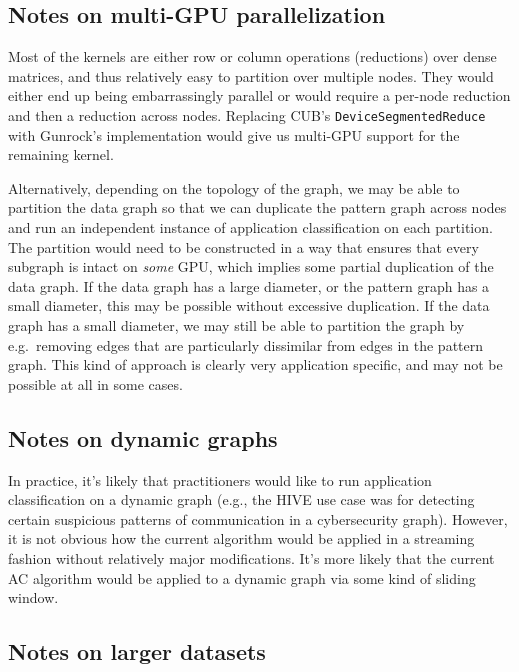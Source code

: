 \documentclass[10pt,oneside]{memoir}
\begin{document}
\hypertarget{notes-on-multi-gpu-parallelization}{%
\subsection{Notes on multi-GPU
parallelization}\label{notes-on-multi-gpu-parallelization}}

Most of the kernels are either row or column operations (reductions)
over dense matrices, and thus relatively easy to partition over multiple
nodes. They would either end up being embarrassingly parallel or would
require a per-node reduction and then a reduction across nodes.
Replacing CUB's \texttt{DeviceSegmentedReduce} with Gunrock's
implementation would give us multi-GPU support for the remaining kernel.

Alternatively, depending on the topology of the graph, we may be able to
partition the data graph so that we can duplicate the pattern graph
across nodes and run an independent instance of application
classification on each partition. The partition would need to be
constructed in a way that ensures that every subgraph is intact on
\emph{some} GPU, which implies some partial duplication of the data
graph. If the data graph has a large diameter, or the pattern graph has
a small diameter, this may be possible without excessive duplication. If
the data graph has a small diameter, we may still be able to partition
the graph by e.g.~removing edges that are particularly dissimilar from
edges in the pattern graph. This kind of approach is clearly very
application specific, and may not be possible at all in some cases.

\hypertarget{notes-on-dynamic-graphs}{%
\subsection{Notes on dynamic graphs}\label{notes-on-dynamic-graphs}}

In practice, it's likely that practitioners would like to run
application classification on a dynamic graph (e.g., the HIVE use case
was for detecting certain suspicious patterns of communication in a
cybersecurity graph). However, it is not obvious how the current
algorithm would be applied in a streaming fashion without relatively
major modifications. It's more likely that the current AC algorithm
would be applied to a dynamic graph via some kind of sliding window.

\hypertarget{notes-on-larger-datasets}{%
\subsection{Notes on larger datasets}\label{notes-on-larger-datasets}}
\end{document}
